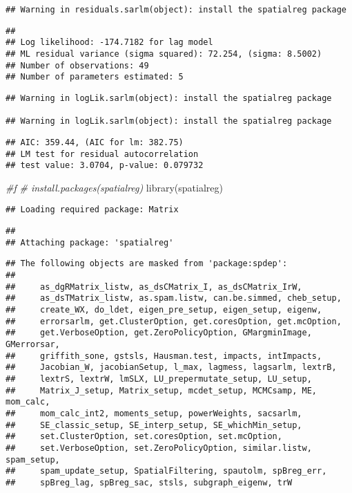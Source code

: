 \documentclass[
]{article}
\newenvironment{Shaded}{\begin{snugshade}}{\end{snugshade}}
\newcommand{\CommentTok}[1]{\textcolor[rgb]{0.56,0.35,0.01}{\textit{#1}}}
\newcommand{\FunctionTok}[1]{\textcolor[rgb]{0.00,0.00,0.00}{#1}}
\newcommand{\NormalTok}[1]{#1}
\begin{document}
\begin{verbatim}
## Warning in residuals.sarlm(object): install the spatialreg package
\end{verbatim}

\begin{verbatim}
## 
## Log likelihood: -174.7182 for lag model
## ML residual variance (sigma squared): 72.254, (sigma: 8.5002)
## Number of observations: 49 
## Number of parameters estimated: 5
\end{verbatim}

\begin{verbatim}
## Warning in logLik.sarlm(object): install the spatialreg package

## Warning in logLik.sarlm(object): install the spatialreg package
\end{verbatim}

\begin{verbatim}
## AIC: 359.44, (AIC for lm: 382.75)
## LM test for residual autocorrelation
## test value: 3.0704, p-value: 0.079732
\end{verbatim}

\begin{Shaded}
\begin{Highlighting}[]
\CommentTok{\#ƒ}
\CommentTok{\# install.packages(\textquotesingle{}spatialreg\textquotesingle{})}
\FunctionTok{library}\NormalTok{(spatialreg)}
\end{Highlighting}
\end{Shaded}

\begin{verbatim}
## Loading required package: Matrix
\end{verbatim}

\begin{verbatim}
## 
## Attaching package: 'spatialreg'
\end{verbatim}

\begin{verbatim}
## The following objects are masked from 'package:spdep':
## 
##     as_dgRMatrix_listw, as_dsCMatrix_I, as_dsCMatrix_IrW,
##     as_dsTMatrix_listw, as.spam.listw, can.be.simmed, cheb_setup,
##     create_WX, do_ldet, eigen_pre_setup, eigen_setup, eigenw,
##     errorsarlm, get.ClusterOption, get.coresOption, get.mcOption,
##     get.VerboseOption, get.ZeroPolicyOption, GMargminImage, GMerrorsar,
##     griffith_sone, gstsls, Hausman.test, impacts, intImpacts,
##     Jacobian_W, jacobianSetup, l_max, lagmess, lagsarlm, lextrB,
##     lextrS, lextrW, lmSLX, LU_prepermutate_setup, LU_setup,
##     Matrix_J_setup, Matrix_setup, mcdet_setup, MCMCsamp, ME, mom_calc,
##     mom_calc_int2, moments_setup, powerWeights, sacsarlm,
##     SE_classic_setup, SE_interp_setup, SE_whichMin_setup,
##     set.ClusterOption, set.coresOption, set.mcOption,
##     set.VerboseOption, set.ZeroPolicyOption, similar.listw, spam_setup,
##     spam_update_setup, SpatialFiltering, spautolm, spBreg_err,
##     spBreg_lag, spBreg_sac, stsls, subgraph_eigenw, trW
\end{verbatim}
\end{document}
